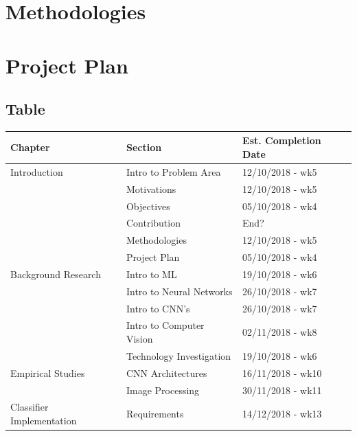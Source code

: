 \documentclass[12pt]{report}
\begin{document}
\section{Methodologies}

\section{Project Plan}
\subsection{Table}
\vspace{1.5cm}
\begin{table}[]
\begin{tabular}{|l|l|l|}
\hline
Chapter                   & Section                  & Est. Completion Date \\ \hline
Introduction              & Intro to Problem Area    & 12/10/2018 - wk5     \\ \hline
                          & Motivations              & 12/10/2018 - wk5     \\ \hline
                          & Objectives               & 05/10/2018 - wk4     \\ \hline
                          & Contribution             & End?                 \\ \hline
                          & Methodologies            & 12/10/2018 - wk5     \\ \hline
                          & Project Plan             & 05/10/2018 - wk4     \\ \hline
Background Research       & Intro to ML              & 19/10/2018 - wk6     \\ \hline
                          & Intro to Neural Networks & 26/10/2018 - wk7     \\ \hline
                          & Intro to CNN's           & 26/10/2018 - wk7     \\ \hline
                          & Intro to Computer Vision & 02/11/2018 - wk8     \\ \hline
                          & Technology Investigation & 19/10/2018 - wk6     \\ \hline
Empirical Studies         & CNN Architectures        & 16/11/2018 - wk10    \\ \hline
                          & Image Processing         & 30/11/2018 - wk11    \\ \hline                   
Classifier Implementation & Requirements             & 14/12/2018 - wk13    \\ \hline

\end{tabular}
\end{table}
\end{document}
